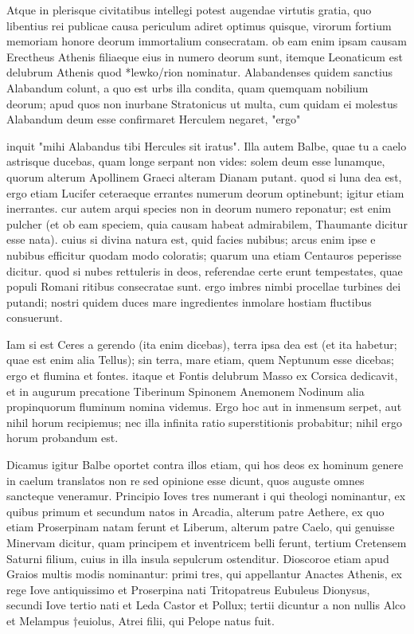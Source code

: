  Atque in plerisque civitatibus intellegi potest augendae virtutis gratia, quo libentius rei publicae causa periculum adiret optimus quisque, virorum fortium memoriam honore deorum immortalium consecratam. ob eam enim ipsam causam Erectheus Athenis filiaeque eius in numero deorum sunt, itemque Leonaticum est delubrum Athenis quod *lewko/rion nominatur. Alabandenses quidem sanctius Alabandum colunt, a quo est urbs illa condita, quam quemquam nobilium deorum; apud quos non inurbane Stratonicus ut multa, cum quidam ei molestus Alabandum deum esse confirmaret Herculem negaret, "ergo"

 inquit "mihi Alabandus tibi Hercules sit iratus". Illa autem Balbe, quae tu a caelo astrisque ducebas, quam longe serpant non vides: solem deum esse lunamque, quorum alterum Apollinem Graeci alteram Dianam putant. quod si luna dea est, ergo etiam Lucifer ceteraeque errantes numerum deorum optinebunt; igitur etiam inerrantes. cur autem arqui species non in deorum numero reponatur; est enim pulcher (et ob eam speciem, quia causam habeat admirabilem, Thaumante dicitur esse nata). cuius si divina natura est, quid facies nubibus; arcus enim ipse e nubibus efficitur quodam modo coloratis; quarum una etiam Centauros peperisse dicitur. quod si nubes rettuleris in deos, referendae certe erunt tempestates, quae populi Romani ritibus consecratae sunt. ergo imbres nimbi procellae turbines dei putandi; nostri quidem duces mare ingredientes inmolare hostiam fluctibus consuerunt.

 Iam si est Ceres a gerendo (ita enim dicebas), terra ipsa dea est (et ita habetur; quae est enim alia Tellus); sin terra, mare etiam, quem Neptunum esse dicebas; ergo et flumina et fontes. itaque et Fontis delubrum Masso ex Corsica dedicavit, et in augurum precatione Tiberinum Spinonem Anemonem Nodinum alia propinquorum fluminum nomina videmus. Ergo hoc aut in inmensum serpet, aut nihil horum recipiemus; nec illa infinita ratio superstitionis probabitur; nihil ergo horum probandum est.

 Dicamus igitur Balbe oportet contra illos etiam, qui hos deos ex hominum genere in caelum translatos non re sed opinione esse dicunt, quos auguste omnes sancteque veneramur. Principio Ioves tres numerant i qui theologi nominantur, ex quibus primum et secundum natos in Arcadia, alterum patre Aethere, ex quo etiam Proserpinam natam ferunt et Liberum, alterum patre Caelo, qui genuisse Minervam dicitur, quam principem et inventricem belli ferunt, tertium Cretensem Saturni filium, cuius in illa insula sepulcrum ostenditur. Dioscoroe etiam apud Graios multis modis nominantur: primi tres, qui appellantur Anactes Athenis, ex rege Iove antiquissimo et Proserpina nati Tritopatreus Eubuleus Dionysus, secundi Iove tertio nati et Leda Castor et Pollux; tertii dicuntur a non nullis Alco et Melampus †euiolus, Atrei filii, qui Pelope natus fuit.

